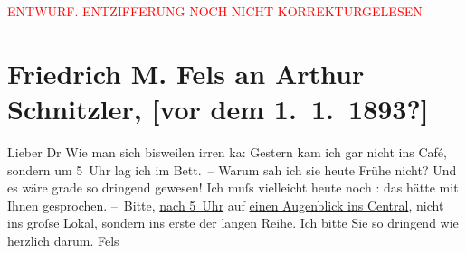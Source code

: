 
\begin{center}
            \textcolor{red}{ENTWURF. ENTZIFFERUNG NOCH NICHT KORREKTURGELESEN}
                      \end{center}
            
               \section[Friedrich M. Fels an Arthur Schnitzler, {[}vor dem 1. 1. 1893?{]}]{ Friedrich M. Fels an Arthur Schnitzler, {[}vor dem 1. 1. 1893?{]}}\nopagebreak{}\rehead{ }\begin{ledgroupsized}[t]{13cm}\normalsize\beginnumbering{} \toendnotes[C]{\smallbreak\pagebreak[2]} 
\toendnotes[C]{\smallbreak}\pstart
           \noindent{}{\pb}Lieber Dr \hspace*{1.5em}Wie man sich bisweilen irren ka{\geminationn}: Gestern kam ich gar nicht ins Café, sondern um
                  5 Uhr lag ich im Bett. – Warum sah ich sie heute Frühe nicht? Und es
               wäre grade so dringend gewesen! Ich muſs vielleicht heute noch \label{K_L00152_1v}\label{K_L00152_1h}: das hätte mit Ihnen gesprochen.\pend
           \pstart
           – Bitte, \uline{nach 5 Uhr} auf \uline{einen Augenblick ins Central}, nicht ins groſse Lokal, sondern ins erste der langen Reihe. Ich bitte Sie so
               dringend wie herzlich darum.\pend
           \pstart \spacefill\mbox{Fels}\pend{}\endnumbering{}\end{ledgroupsized}  \newcommand{\dateiname}{L00152}\newcommand{\titel}{Friedrich M. Fels an Arthur Schnitzler, [vor dem 1. 1. 1893?]}\newcommand{\editorInnen}{Martin Anton Müller und Gerd-Hermann Susen}
      